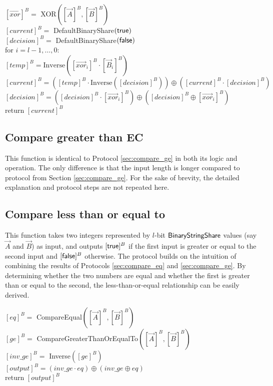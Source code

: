 \begin{protocol}[CompareGreaterThanOrEqualTo$({[\vec{A}]^B}, {[\vec{B}]^B})$]
	${[\vec{xor}]^B} =$ XOR$({[\vec{A}]^B}, {[\vec{B}]^B})$\\
	$[current]^B = $ DefaultBinaryShare$(\mathsf{true})$ \\
	$[decision]^B = $ DefaultBinaryShare$(\mathsf{false})$ \\
	for $i = l - 1, \ldots, 0$:\\
	\indent $[temp]^B = \text{Inverse}([\vec{xor}_i]^B \cdot [\vec{B}_i]^B)$\\
        \indent $[current]^B = ([temp]^B \cdot \text{Inverse}([decision]^B)) \oplus ([current]^B \cdot [decision]^B)$\\
	\indent $[decision]^B = ([decision]^B \cdot [\vec{xor}_i]^B) \oplus ([decision]^B \oplus [\vec{xor}_i]^B)$\\
	return $[current]^B$
\end{protocol}

\subsection{Compare greater than EC}
\label{sec:compare_ge_ec}

This function is identical to Protocol \ref{sec:compare_ge} in both its logic and operation. The only difference is that the input length is longer compared to protocol from Section \ref{sec:compare_ge}. For the sake of brevity, the detailed explanation and protocol steps are not repeated here.

\subsection{Compare less than or equal to}
\label{sec:compare_le}

This function takes two integers represented by $l$-bit ${\mathsf{BinaryStringShare}}$ values (say $\vec{A}$ and $\vec{B}$) as input, and outputs $[\mathsf{true}]^B$ if the first input is greater or equal to the second input and $[\mathsf{false}]^B$ otherwise. The protocol builds on the intuition of combining the results of Protocols \ref{sec:compare_eq} and \ref{sec:compare_ge}. By determining whether the two numbers are equal and whether the first is greater than or equal to the second, the less-than-or-equal relationship can be easily derived.


\begin{protocol}[CompareLessThanOrEqualTo$({[\vec{A}]^B}, {[\vec{B}]^B})$]
	$[eq]^B =$ CompareEqual$({[\vec{A}]^B}, {[\vec{B}]^B})$\\
	$[ge]^B =$ CompareGreaterThanOrEqualTo$({[\vec{A}]^B}, {[\vec{B}]^B})$\\
	$[inv\_ge]^B =$ Inverse$([ge]^B)$\\
	$[output]^B = (inv\_ge \cdot eq) \oplus (inv\_ge \oplus eq)$\\ 
	return $[output]^B$
\end{protocol}